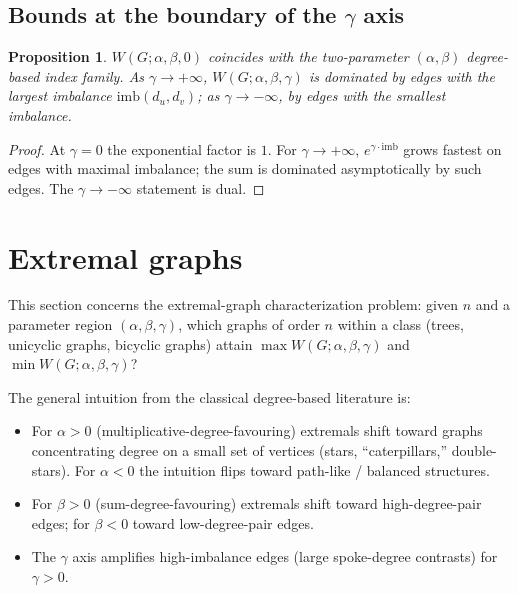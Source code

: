 \documentclass[11pt,a4paper]{article}
\newtheorem{proposition}[theorem]{Proposition}
\theoremstyle{definition}
\newcommand{\Wuzi}{W(G;\alpha,\beta,\gamma)}
\begin{document}
\subsection{Bounds at the boundary of the $\gamma$ axis}

\begin{proposition}\label{prop:gamma_eq_0_or_inf}
$W(G;\alpha,\beta,0)$ coincides with the two-parameter
$(\alpha,\beta)$ degree-based index family. As $\gamma\to+\infty$,
$\Wuzi$ is dominated by edges with the largest imbalance
$\mathrm{imb}(d_u,d_v)$; as $\gamma\to-\infty$, by edges with
the smallest imbalance.
\end{proposition}

\begin{proof}
At $\gamma=0$ the exponential factor is $1$. For $\gamma\to+\infty$,
$e^{\gamma\cdot \mathrm{imb}}$ grows fastest on edges with maximal
imbalance; the sum is dominated asymptotically by such edges. The
$\gamma\to-\infty$ statement is dual.
\end{proof}

\section{Extremal graphs}\label{sec:extremal}

This section concerns the extremal-graph characterization problem:
given $n$ and a parameter region $(\alpha,\beta,\gamma)$, which
graphs of order $n$ within a class (trees, unicyclic graphs,
bicyclic graphs) attain $\max\Wuzi$ and $\min\Wuzi$?

The general intuition from the classical degree-based literature
\cite{Randic1975, GutmanFurtulaBook2017} is:
\begin{itemize}
\item For $\alpha>0$ (multiplicative-degree-favouring) extremals
shift toward graphs concentrating degree on a small set of vertices
(stars, ``caterpillars,'' double-stars). For $\alpha<0$ the
intuition flips toward path-like / balanced structures.
\item For $\beta>0$ (sum-degree-favouring) extremals shift toward
high-degree-pair edges; for $\beta<0$ toward low-degree-pair edges.
\item The $\gamma$ axis amplifies high-imbalance edges (large
spoke-degree contrasts) for $\gamma>0$.
\end{itemize}
\end{document}
